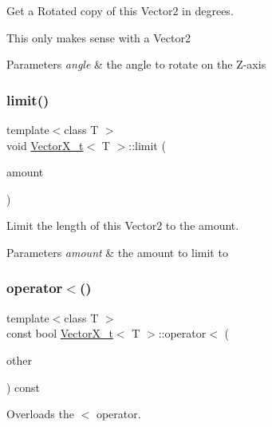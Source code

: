Get a Rotated copy of this Vector2 in degrees. 

This only makes sense with a Vector2


\begin{DoxyParams}{Parameters}
{\em angle} & the angle to rotate on the Z-\/axis \\
\hline
\end{DoxyParams}
\mbox{\label{class_vector_x__t_a2a4914eef4789c14c1c78b235b298565}} 
\subsubsection{\texorpdfstring{limit()}{limit()}}
{\footnotesize\ttfamily template$<$class T $>$ \\
void \hyperlink{class_vector_x__t}{Vector\+X\+\_\+t}$<$ T $>$\+::limit (\begin{DoxyParamCaption}\item[{T}]{amount }\end{DoxyParamCaption})}



Limit the length of this Vector2 to the amount. 


\begin{DoxyParams}{Parameters}
{\em amount} & the amount to limit to \\
\hline
\end{DoxyParams}
\mbox{\label{class_vector_x__t_a4e568334b218fda51d03636310f23ab4}} 
\subsubsection{\texorpdfstring{operator$<$()}{operator<()}}
{\footnotesize\ttfamily template$<$class T $>$ \\
const bool \hyperlink{class_vector_x__t}{Vector\+X\+\_\+t}$<$ T $>$\+::operator$<$ (\begin{DoxyParamCaption}\item[{\hyperlink{class_vector_x__t}{Vector\+X\+\_\+t}$<$ T $>$}]{other }\end{DoxyParamCaption}) const}



Overloads the $<$ operator. 


